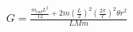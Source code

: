 \documentclass[preview]{standalone}
\begin{document}
\begin{align*}
G = \frac{\frac{m_{rod}L^2}{12}+2m(\frac{L}{2})^2(\frac{2\pi}{T})^2\theta r^2}{LMm}
\end{align*}
\end{document}
